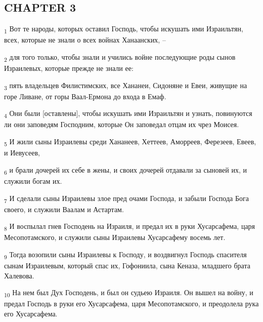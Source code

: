 \subsection{CHAPTER 3}
\begin{tcolorbox}
\textsubscript{1} Вот те народы, которых оставил Господь, чтобы искушать ими Израильтян, всех, которые не знали о всех войнах Ханаанских, --
\end{tcolorbox}
\begin{tcolorbox}
\textsubscript{2} для того только, чтобы знали и учились войне последующие роды сынов Израилевых, которые прежде не знали ее:
\end{tcolorbox}
\begin{tcolorbox}
\textsubscript{3} пять владельцев Филистимских, все Хананеи, Сидоняне и Евеи, живущие на горе Ливане, от горы Ваал-Ермона до входа в Емаф.
\end{tcolorbox}
\begin{tcolorbox}
\textsubscript{4} Они были [оставлены], чтобы искушать ими Израильтян и узнать, повинуются ли они заповедям Господним, которые Он заповедал отцам их чрез Моисея.
\end{tcolorbox}
\begin{tcolorbox}
\textsubscript{5} И жили сыны Израилевы среди Хананеев, Хеттеев, Аморреев, Ферезеев, Евеев, и Иевусеев,
\end{tcolorbox}
\begin{tcolorbox}
\textsubscript{6} и брали дочерей их себе в жены, и своих дочерей отдавали за сыновей их, и служили богам их.
\end{tcolorbox}
\begin{tcolorbox}
\textsubscript{7} И сделали сыны Израилевы злое пред очами Господа, и забыли Господа Бога своего, и служили Ваалам и Астартам.
\end{tcolorbox}
\begin{tcolorbox}
\textsubscript{8} И воспылал гнев Господень на Израиля, и предал их в руки Хусарсафема, царя Месопотамского, и служили сыны Израилевы Хусарсафему восемь лет.
\end{tcolorbox}
\begin{tcolorbox}
\textsubscript{9} Тогда возопили сыны Израилевы к Господу, и воздвигнул Господь спасителя сынам Израилевым, который спас их, Гофониила, сына Кеназа, младшего брата Халевова.
\end{tcolorbox}
\begin{tcolorbox}
\textsubscript{10} На нем был Дух Господень, и был он судьею Израиля. Он вышел на войну, и предал Господь в руки его Хусарсафема, царя Месопотамского, и преодолела рука его Хусарсафема.
\end{tcolorbox}
